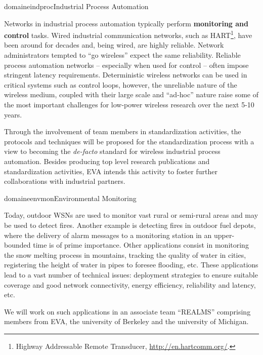 \documentclass{ra2016}
\begin{document}
\begin{module}{domaine}{indproc}{Industrial Process Automation}

Networks in industrial process automation typically perform \textbf{monitoring and control} tasks.
Wired industrial communication networks, such as HART\footnote{Highway Addressable Remote Transducer, \url{http://en.hartcomm.org/}.}, have been around for decades and, being wired, are highly reliable.
Network administrators tempted to ``go wireless'' expect the same reliability.
Reliable process automation networks -- especially when used for control -- often impose stringent latency requirements.
Deterministic wireless networks can be used in critical systems such as control loops, however, the unreliable nature of the wireless medium, coupled with their large scale and ``ad-hoc'' nature raise some of the most important challenges for low-power wireless research over the next 5-10 years.

Through the involvement of team members in standardization activities, the protocols and techniques will be proposed for the standardization process with a view to becoming the \textit{de-facto} standard for wireless industrial process automation.
Besides producing top level research publications and standardization activities, EVA intends this activity to foster further collaborations with industrial partners.

\end{module}

\begin{module}{domaine}{envmon}{Environmental Monitoring}

Today, outdoor WSNs are used to monitor vast rural or semi-rural areas and may be used to detect fires.
Another example is detecting fires in outdoor fuel depots, where the delivery of alarm messages to a monitoring station in an upper-bounded time is of prime importance.
Other applications consist in monitoring the snow melting process in mountains, tracking the quality of water in cities, registering the height of water in pipes to foresee flooding, etc.
These applications lead to a vast number of technical issues: deployment strategies to ensure suitable coverage and good network connectivity, energy efficiency, reliability and latency, etc.

We will work on such applications in an associate team ``REALMS'' comprising members from EVA, the university of Berkeley and the university of Michigan. 

\end{module}
\end{document}
